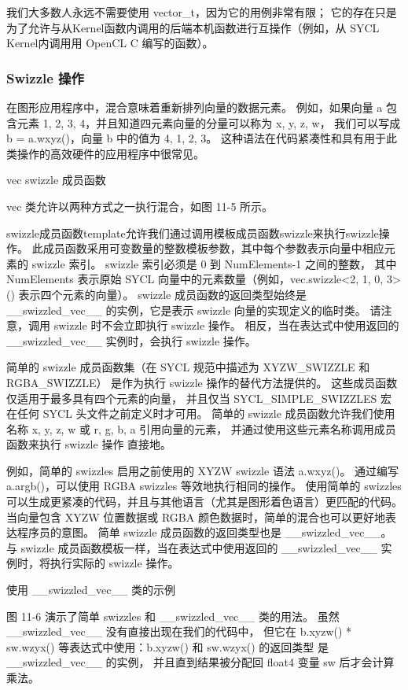 我们大多数人永远不需要使用 vector\_t，因为它的用例非常有限； 
它的存在只是为了允许与从Kernel函数内调用的后端本机函数进行互操作（例如，从 SYCL Kernel内调用用 OpenCL C 编写的函数）。

\subsubsection{Swizzle 操作}
在图形应用程序中，混合意味着重新排列向量的数据元素。 
例如，如果向量 a 包含元素 {1, 2, 3, 4}，并且知道四元素向量的分量可以称为 {x, y, z, w}，
我们可以写成 b = a.wxyz()，向量 b 中的值为 {4, 1, 2, 3}。 
这种语法在代码紧凑性和具有用于此类操作的高效硬件的应用程序中很常见。

{\color{red} vec swizzle 成员函数}

vec 类允许以两种方式之一执行混合，如图 11-5 所示。

swizzle成员函数template允许我们通过调用模板成员函数swizzle来执行swizzle操作。 
此成员函数采用可变数量的整数模板参数，其中每个参数表示向量中相应元素的 swizzle 索引。 
swizzle 索引必须是 0 到 NumElements-1 之间的整数，
其中 NumElements 表示原始 SYCL 向量中的元素数量（例如，vec.swizzle<2, 1, 0, 3>() 表示四个元素的向量）。 
swizzle 成员函数的返回类型始终是 \_\_swizzled\_vec\_\_ 的实例，它是表示 swizzle 向量的实现定义的临时类。 
请注意，调用 swizzle 时不会立即执行 swizzle 操作。 
相反，当在表达式中使用返回的 \_\_swizzled\_vec\_\_ 实例时，会执行 swizzle 操作。

简单的 swizzle 成员函数集（在 SYCL 规范中描述为 XYZW\_SWIZZLE 和 RGBA\_SWIZZLE）
是作为执行 swizzle 操作的替代方法提供的。 这些成员函数仅适用于最多具有四个元素的向量，
并且仅当 SYCL\_SIMPLE\_SWIZZLES 宏在任何 SYCL 头文件之前定义时才可用。 
简单的 swizzle 成员函数允许我们使用名称 {x, y, z, w} 或 {r, g, b, a} 引用向量的元素，
并通过使用这些元素名称调用成员函数来执行 swizzle 操作 直接地。

例如，简单的 swizzles 启用之前使用的 XYZW swizzle 语法 a.wxyz()。 
通过编写 a.argb()，可以使用 RGBA swizzles 等效地执行相同的操作。 
使用简单的 swizzles 可以生成更紧凑的代码，并且与其他语言（尤其是图形着色语言）更匹配的代码。 
当向量包含 XYZW 位置数据或 RGBA 颜色数据时，简单的混合也可以更好地表达程序员的意图。 
简单 swizzle 成员函数的返回类型也是 \_\_swizzled\_vec\_\_。 
与 swizzle 成员函数模板一样，当在表达式中使用返回的 \_\_swizzled\_vec\_\_ 实例时，将执行实际的 swizzle 操作。

{\color{red} 使用 \_\_swizzled\_vec\_\_ 类的示例}

图 11-6 演示了简单 swizzles 和 \_\_swizzled\_vec\_\_ 类的用法。 
虽然 \_\_swizzled\_vec\_\_ 没有直接出现在我们的代码中，
但它在 b.xyzw() * sw.wzyx() 等表达式中使用：b.xyzw() 和 sw.wzyx() 的返回类型
是 \_\_swizzled\_vec\_\_ 的实例， 并且直到结果被分配回 float4 变量 sw 后才会计算乘法。

